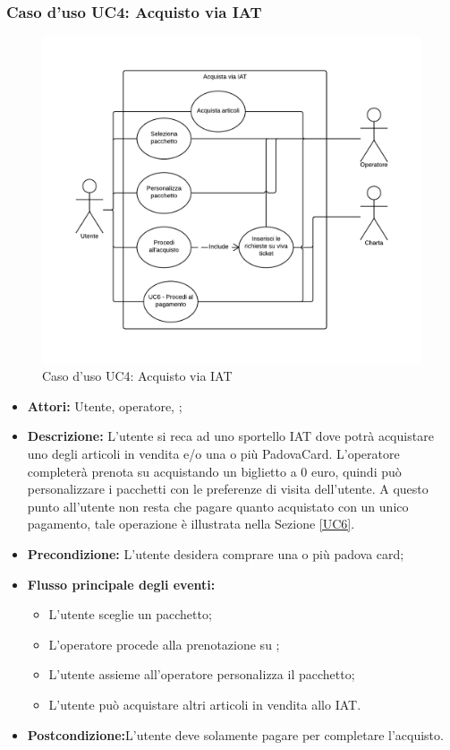\subsubsection{Caso d'uso UC4: Acquisto via IAT}\label{UC4}
\begin{figure}[H]
\centering
\includegraphics[width=1\textwidth]{images/UC4.png}
\caption{Caso d'uso UC4: Acquisto via IAT}
\end{figure}
\begin{itemize}
\item \textbf{Attori:} Utente, operatore, \charta;
\item \textbf{Descrizione:} L'utente si reca ad uno sportello IAT dove potrà acquistare uno degli articoli in vendita e/o una o più PadovaCard. L'operatore completerà prenota su \tlite acquistando un biglietto a 0 euro, quindi può personalizzare i pacchetti con le preferenze di visita  dell'utente. A questo punto all'utente non resta che pagare quanto acquistato con un unico pagamento, tale operazione è illustrata nella Sezione \ref{UC6}.
\item \textbf{Precondizione:} L'utente desidera comprare una o più padova card;
\item \textbf{Flusso principale degli eventi:}
	\begin{itemize}
    	\item L'utente sceglie un pacchetto;
        \item L'operatore procede alla prenotazione su \tlite;
		\item L'utente assieme all'operatore personalizza il pacchetto;
		\item L'utente può acquistare altri articoli in vendita allo IAT.
	\end{itemize}
\item \textbf{Postcondizione:}L'utente deve solamente pagare per completare l'acquisto.
\end{itemize}

